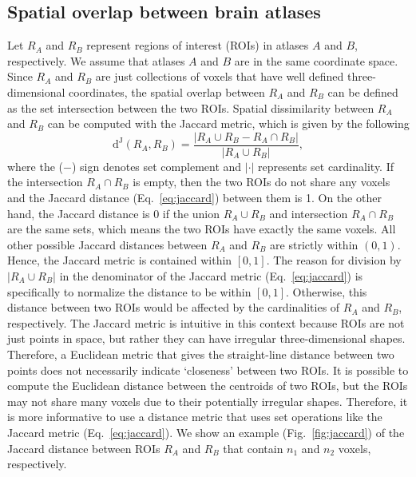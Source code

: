 \documentclass[10pt,letterpaper]{article}\usepackage[]{graphicx}\usepackage[]{color}
\begin{document}
\subsection{Spatial overlap between brain atlases}
Let $R_A$ and $R_B$ represent regions of interest (ROIs) in atlases $A$ and $B$, respectively. We assume that atlases $A$ and $B$ are in the same coordinate space. Since $R_A$ and $R_B$ are just collections of voxels that have well defined three-dimensional coordinates, the spatial overlap between $R_A$ and $R_B$ can be defined as the set intersection between the two ROIs. Spatial dissimilarity between $R_A$ and $R_B$ can be computed with the Jaccard metric, which is given by the following
%
\begin{equation}\label{eq:jaccard}
\text{d}^\text{J}(R_A,R_B) = \frac{|R_A \cup R_B - R_A \cap R_B|}{|R_A \cup R_B|},
\end{equation}
%
where the ($-$) sign denotes set complement and $|\cdot|$ represents set cardinality. If the intersection $R_A \cap R_B$ is empty, then the two ROIs do not share any voxels and the Jaccard distance (Eq.~\ref{eq:jaccard}) between them is 1. On the other hand, the Jaccard distance is 0 if the union $R_A \cup R_B$ and intersection $R_A \cap R_B$ are the same sets, which means the two ROIs have exactly the same voxels. All other possible Jaccard distances between $R_A$ and $R_B$ are strictly within $(0,1)$. Hence, the Jaccard metric is contained within $[0,1]$. The reason for division by $|R_A \cup R_B|$ in the denominator of the Jaccard metric (Eq.~\ref{eq:jaccard}) is specifically to normalize the distance to be within $[0,1]$. Otherwise, this distance between two ROIs would be affected by the cardinalities of $R_A$ and $R_B$, respectively. The Jaccard metric is intuitive in this context because ROIs are not just points in space, but rather they can have irregular three-dimensional shapes. Therefore, a Euclidean metric that gives the straight-line distance between two points does not necessarily indicate `closeness' between two ROIs. It is possible to compute the Euclidean distance between the centroids of two ROIs, but the ROIs may not share many voxels due to their potentially irregular shapes. Therefore, it is more informative to use a distance metric that uses set operations like the Jaccard metric (Eq.~\ref{eq:jaccard}). We show an example (Fig.~\ref{fig:jaccard}) of the Jaccard distance between ROIs $R_A$ and $R_B$ that contain $n_1$ and $n_2$ voxels, respectively. 

\vspace{0.25cm}
\end{document}
